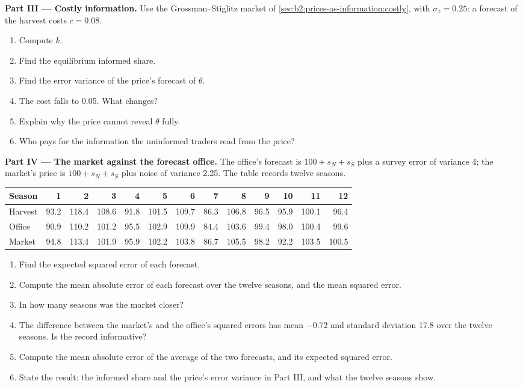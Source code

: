 \begin{problem}
\medskip
\noindent\textbf{Part III --- Costly information.} Use the Grossman--Stiglitz market of
\cref{sec:b2:prices-as-information:costly}, with $\sigma_z = 0.25$: a forecast of the harvest costs $c =
0.08$.
\begin{enumerate}[resume]
  \item Compute $k$.
  \item Find the equilibrium informed share.
  \item Find the error variance of the price's forecast of $\theta$.
  \item The cost falls to 0.05. What changes?
  \item Explain why the price cannot reveal $\theta$ fully.
  \item Who pays for the information the uninformed traders read from the price?
\end{enumerate}

\medskip
\noindent\textbf{Part IV --- The market against the forecast office.} The office's forecast is $100 + s_N +
s_S$ plus a survey error of variance 4; the market's price is $100 + s_N + s_S$ plus noise of variance 2.25.
The table records twelve seasons.

\begin{center}
\small
\begin{tabular}{lrrrrrrrrrrrr}
\toprule
Season & 1 & 2 & 3 & 4 & 5 & 6 & 7 & 8 & 9 & 10 & 11 & 12 \\
\midrule
Harvest & 93.2 & 118.4 & 108.6 & 91.8 & 101.5 & 109.7 & 86.3 & 106.8 & 96.5 & 95.9 & 100.1 & 96.4 \\
Office  & 90.9 & 110.2 & 101.2 & 95.5 & 102.9 & 109.9 & 84.4 & 103.6 & 99.4 & 98.0 & 100.4 & 99.6 \\
Market  & 94.8 & 113.4 & 101.9 & 95.9 & 102.2 & 103.8 & 86.7 & 105.5 & 98.2 & 92.2 & 103.5 & 100.5 \\
\bottomrule
\end{tabular}
\end{center}

\begin{enumerate}[resume]
  \item Find the expected squared error of each forecast.
  \item Compute the mean absolute error of each forecast over the twelve seasons, and the mean squared
        error.
  \item In how many seasons was the market closer?
  \item The difference between the market's and the office's squared errors has mean $-0.72$ and standard
        deviation 17.8 over the twelve seasons. Is the record informative?
  \item Compute the mean absolute error of the average of the two forecasts, and its expected squared
        error.
  \item State the result: the informed share and the price's error variance in Part III, and what the
        twelve seasons show.
\end{enumerate}
\end{problem}
